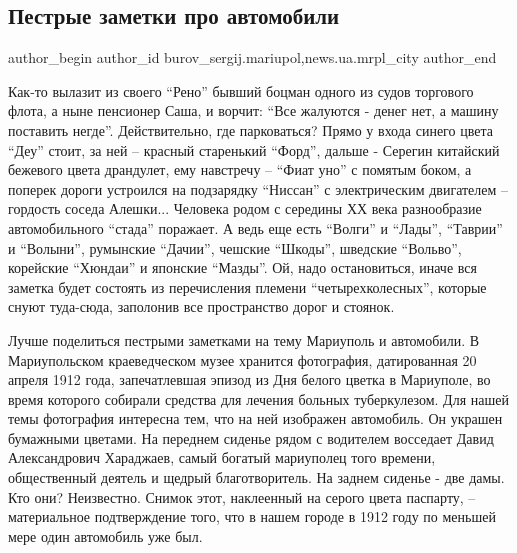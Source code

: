  
 
 
 
 
 
\subsection{Пестрые заметки про автомобили}
\label{sec:04_11_2017.stz.news.ua.mrpl_city.1.pestrye_zametki_pro_avtomobili}
 
\ifcmt
 author_begin
   author_id burov_sergij.mariupol,news.ua.mrpl_city
 author_end
\fi

Как-то вылазит из своего \enquote{Рено} бывший боцман одного из судов торгового флота,
а ныне пенсионер Саша, и ворчит: \enquote{Все жалуются - денег нет, а машину поставить
негде}. Действительно, где парковаться? Прямо у входа синего цвета \enquote{Деу} стоит,
за ней – красный старенький \enquote{Форд}, дальше - Серегин китайский бежевого цвета
драндулет, ему навстречу – \enquote{Фиат уно} с помятым боком, а поперек дороги
устроился на подзарядку \enquote{Ниссан} с электрическим двигателем – гордость  соседа
Алешки... Человека  родом с середины ХХ века разнообразие автомобильного \enquote{стада}
поражает. А ведь еще есть \enquote{Волги} и \enquote{Лады}, \enquote{Таврии} и \enquote{Волыни}, румынские
\enquote{Дачии}, чешские \enquote{Шкоды}, шведские \enquote{Вольво}, корейские \enquote{Хюндаи} и японские
\enquote{Мазды}. Ой, надо остановиться, иначе вся заметка будет состоять из
перечисления племени \enquote{четырехколесных}, которые снуют туда-сюда, заполонив все
пространство дорог и стоянок.


Лучше поделиться пестрыми заметками на тему Мариуполь и автомобили. В
Мариупольском краеведческом музее хранится фотография, датированная 20 апреля
1912 года, запечатлевшая  эпизод  из Дня белого цветка в Мариуполе, во время
которого собирали средства для лечения больных туберкулезом. Для нашей темы
фотография интересна тем, что на ней изображен автомобиль. Он украшен бумажными
цветами. На переднем сиденье рядом с водителем восседает Давид Александрович
Хараджаев, самый богатый мариуполец того времени, общественный деятель и щедрый
благотворитель. На заднем сиденье - две дамы. Кто они? Неизвестно. Снимок этот,
наклеенный на серого цвета паспарту,  – материальное подтверждение того, что в
нашем городе в 1912 году по меньшей мере один автомобиль уже был.

